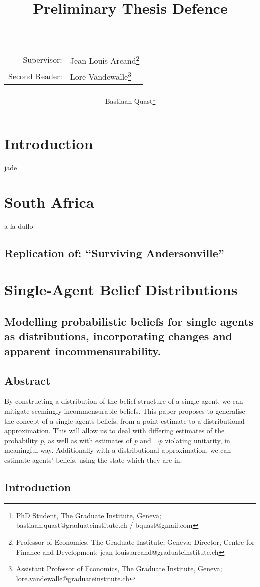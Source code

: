 \documentclass[a4paper]{book}\usepackage{graphicx, color}
\title{Preliminary Thesis Defence\\~\\
\begin{tabular}{rl}
Supervisor:&Jean-Louis Arcand\footnote{Professor of Economics, The Graduate Institute, Geneva; Director, Centre for Finance and Development; jean-louis.arcand@graduateinstitute.ch}\\
Second Reader:&Lore Vandewalle\footnote{Assistant Professor of Economics, The Graduate Institute, Geneva; lore.vandewalle@graduateinstitute.ch}
\end{tabular}
}
\author{Bastiaan Quast\thanks{PhD Student, The Graduate Institute, Geneva; bastiaan.quast@graduateinstitute.ch / bquast@gmail.com}}
\begin{document}
\frontmatter
\maketitle
\tableofcontents

\chapter{Introduction}
jade

\mainmatter
\chapter{South Africa}
a la duflo

\begin{refsection}
\chapter{Replication of: ``Surviving Andersonville''}

\printbibliography
\end{refsection}

\chapter{Single-Agent Belief Distributions}

\section{Modelling probabilistic beliefs for single agents as
distributions, incorporating changes and apparent incommensurability.}

\section{Abstract}

By constructing a distribution of the belief structure of a single
agent, we can mitigate seemingly incommensurable beliefs. This paper
proposes to generalise the concept of a single agents beliefs, from a
point estimate to a distributional approximation. This will allow us to
deal with differing estimates of the probability \emph{p}, as well as
with estimates of \emph{p} and \emph{¬p} violating unitarity, in
meaningful way. Additionally with a distributional approximation, we can
estimate agents' beliefs, using the state which they are in.

\section{Introduction}
\end{document}

